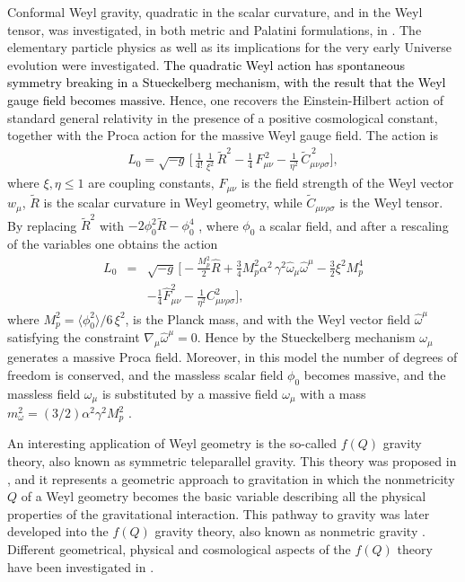 \documentclass[aps,superscriptaddress, showpacs,preprintnumbers, superscriptaddress, nofootinbibt,twocolumn]{revtex4}
\def\bea{\begin{eqnarray}}
\def\eea{\end{eqnarray}}
\newcommand{\te}[1]{\textcolor{black}{#1}}
\begin{document}
 Conformal Weyl gravity, quadratic in the scalar curvature, and in the Weyl tensor, was investigated, in both metric and Palatini formulations, in \cite{Gh1,Gh2,Gh3,Gh4,Gh5,Gh6,Gh7}. The elementary particle physics as well as its implications for the very early Universe evolution were investigated. \te{The quadratic Weyl action has spontaneous symmetry breaking in a Stueckelberg mechanism, with the result that the Weyl gauge field becomes massive.} Hence, one recovers the Einstein-Hilbert action of standard general relativity in the presence of a positive cosmological constant, together with the Proca action for the massive Weyl gauge field. The action is \cite{Gh7}
\bea
L_0=\sqrt{-g} \,\Big[\, \frac{1}{4!}\,\frac{1}{\xi^2}\,\tilde R^2  - \frac14\, F_{\mu\nu}^{\,2}
-\frac{1}{\eta^2}\,\tilde C_{\mu\nu\rho\sigma}^{\,2}\Big],
\eea
where $\xi, \eta\leq 1$ are coupling constants,  $F_{\mu\nu}$ is the field strength of the Weyl vector $w_\mu$,
 $\tilde R$ is the scalar curvature in Weyl geometry, while $\tilde C_{\mu\nu\rho\sigma}$
is the  Weyl tensor. By replacing  $\tilde R^2$ with $ -2\phi_0^2 \tilde R-\phi_0^4$  \cite{Gh7}, where $\phi_0$ a scalar field, and after a rescaling of the variables one obtains the action
\bea
L_0&=&\sqrt{-g} \,\Big[- \frac{ M_p^2}{2}\hat R +\frac{3}{4} M_p^2\alpha ^2\,\gamma^2\hat\omega_\mu \hat \omega^\mu - \frac{3}{2} \xi^2 M_p^4 \nonumber\\
&&-\frac{1}{4} \hat F_{\mu\nu}^2-\frac{1}{\eta^2}  C_{\mu\nu\rho\sigma}^2\Big],
\eea
where $M_p^2= \langle\phi_0^2\rangle/6\,\xi^2$, is the Planck mass, and with the Weyl vector field $\hat\omega ^\mu$ satisfying the constraint  $\nabla_\mu\hat\omega ^\mu=0$. Hence by the Stueckelberg mechanism $\omega_\mu$ generates a massive Proca field. Moreover, in this model the number of degrees of freedom is conserved, and the massless scalar field $\phi_0$  becomes massive, and the massless field $\omega _\mu$ is substituted by a massive field $\omega _\mu$ with a mass $m_\omega ^2=(3/2) \alpha ^2\gamma^2 M_p^2$ \cite{Gh7}.

An interesting application of Weyl geometry is the so-called $f(Q)$ gravity theory, also known as symmetric teleparallel gravity. This theory was proposed in \cite{Q1}, and it represents a geometric approach to gravitation in which the nonmetricity $Q$ of a Weyl geometry becomes the basic variable describing all the physical properties of the gravitational interaction. This pathway to gravity was later developed into the  $f(Q)$ gravity theory, also known as nonmetric gravity \cite{Q2}. Different geometrical, physical and cosmological aspects of the $f(Q)$ theory have been investigated in \cite{Q3,Q4,Q5,Q6,Q7,Q8,Q9,Q10,Q11,Q12,Q13,Q14,Q15,Q16,Q17, Q18, Q19}.
\end{document}
